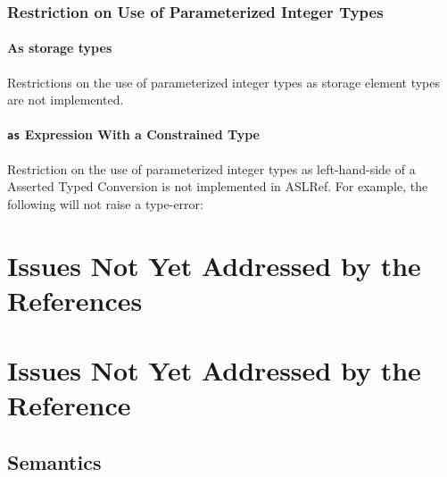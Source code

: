 \subsection{Restriction on Use of Parameterized Integer Types}

\subsubsection{As storage types}
Restrictions on the use of parameterized integer types as storage element types are not
implemented.


\subsubsection{\texttt{as} Expression With a Constrained Type}

Restriction on the use of parameterized integer types as left-hand-side of a
Asserted Typed Conversion is not implemented in ASLRef.
%
For example, the following will not raise a type-error:


\chapter{Issues Not Yet Addressed by the References}
\chapter{Issues Not Yet Addressed by the Reference\label{appendix:MissingTransliteration}}
\section{Semantics}



